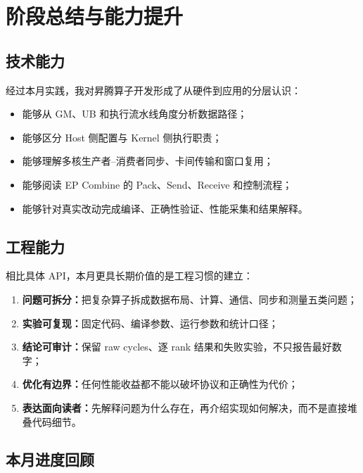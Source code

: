 \documentclass[UTF8,a4paper,11pt]{ctexart}
\newcommand{\term}[1]{\textbf{#1}}
\begin{document}
\section{阶段总结与能力提升}

\subsection{技术能力}

经过本月实践，我对昇腾算子开发形成了从硬件到应用的分层认识：

\begin{itemize}
  \item 能够从 GM、UB 和执行流水线角度分析数据路径；
  \item 能够区分 Host 侧配置与 Kernel 侧执行职责；
  \item 能够理解多核生产者--消费者同步、卡间传输和窗口复用；
  \item 能够阅读 EP Combine 的 Pack、Send、Receive 和控制流程；
  \item 能够针对真实改动完成编译、正确性验证、性能采集和结果解释。
\end{itemize}

\subsection{工程能力}

相比具体 API，本月更具长期价值的是工程习惯的建立：

\begin{enumerate}
  \item \term{问题可拆分：}把复杂算子拆成数据布局、计算、通信、同步和测量五类问题；
  \item \term{实验可复现：}固定代码、编译参数、运行参数和统计口径；
  \item \term{结论可审计：}保留 raw cycles、逐 rank 结果和失败实验，不只报告最好数字；
  \item \term{优化有边界：}任何性能收益都不能以破坏协议和正确性为代价；
  \item \term{表达面向读者：}先解释问题为什么存在，再介绍实现如何解决，而不是直接堆叠代码细节。
\end{enumerate}

\subsection{本月进度回顾}
\end{document}
